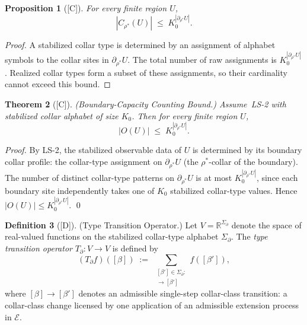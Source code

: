 \documentclass[12pt,oneside]{amsbook}
\theoremstyle{plain}
\newtheorem{theorem}{Theorem}[section]
\newtheorem{proposition}[theorem]{Proposition}
\theoremstyle{definition}
\newtheorem{definition}[theorem]{Definition}
\theoremstyle{remark}
\newcommand{\status}[1]{\textup{[#1]}}
\begin{document}
\begin{proposition}[\status{C}]\label{prop:collar-alphabet-bound}
For every finite region $U$,
\[
  |C_{\rho^*}(U)| \;\leq\; K_0^{|\partial_{\rho^*} U|}.
\]
\end{proposition}

\begin{proof}
A stabilized collar type is determined by an assignment of alphabet
symbols to the collar sites in $\partial_{\rho^*} U$.  The total
number of raw assignments is $K_0^{|\partial_{\rho^*} U|}$.  Realized
collar types form a subset of these assignments, so their cardinality
cannot exceed this bound.
\end{proof}

\begin{theorem}[\status{C}]\label{thm:boundary-capacity}
\textup{(Boundary-Capacity Counting Bound.)}  Assume~LS-2 with
stabilized collar alphabet of size $K_0$.  Then for every finite
region $U$,
\[
  |O(U)| \;\leq\; K_0^{|\partial_{\rho^*} U|}.
\]
\end{theorem}
\begin{proof}
By LS-2, the stabilized observable data of $U$ is determined by
its boundary collar profile: the collar-type assignment on
$\partial_{\rho^*} U$ (the $\rho^*$-collar of the boundary).
The number of distinct collar-type patterns on $\partial_{\rho^*} U$
is at most $K_0^{|\partial_{\rho^*} U|}$, since each boundary site
independently takes one of $K_0$ stabilized collar-type values.
Hence $|O(U)| \leq K_0^{|\partial_{\rho^*} U|}$. \qed
\end{proof}


\begin{definition}[\status{D}]\label{def:T-partial}
\textup{(Type Transition Operator.)}
Let $V = \mathbb{R}^{\Sigma_\partial}$ denote the space of real-valued
functions on the stabilized collar-type alphabet $\Sigma_\partial$.
The \emph{type transition operator}
$T_\partial : V \to V$
is defined by
\[
  (T_\partial f)([\beta])
  \;:=\;
  \sum_{\substack{[\beta'] \in \Sigma_\partial:\\
        [\beta] \to [\beta']}} f([\beta']),
\]
where $[\beta] \to [\beta']$ denotes an admissible single-step
collar-class transition: a collar-class change licensed by one
application of an admissible extension process in $\mathcal{E}$.
\end{definition}
\end{document}
